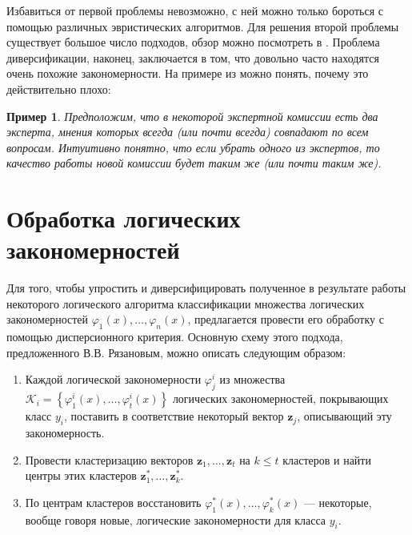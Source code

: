 \documentclass[12pt]{article}
\newtheorem{example}{Пример}
\begin{document}
Избавиться от первой проблемы невозможно, с ней можно только бороться
с помощью различных эвристических алгоритмов. Для решения второй
проблемы существует большое число подходов, обзор можно посмотреть в
\cite{furnkranz97pruning}. Проблема диверсификации, наконец,
заключается в том, что довольно часто находятся очень похожие
закономерности. На примере из \cite{voron10logicalgs} можно понять,
почему это действительно плохо:

\begin{example}
  Предположим, что в некоторой экспертной комиссии есть два эксперта,
  мнения которых всегда (или почти всегда) совпадают по всем
  вопросам. Интуитивно понятно, что если убрать одного из экспертов,
  то качество работы новой комиссии будет таким же (или почти таким
  же).
\end{example}

\section{Обработка логических закономерностей}
\label{sec:processing}


Для того, чтобы упростить и диверсифицировать полученное в результате
работы некоторого логического алгоритма классификации множества
логических закономерностей \(\varphi_1(x), \dots, \varphi_n(x)\),
предлагается провести его обработку с помощью дисперсионного критерия.
Основную схему этого подхода, предложенного В.В. Рязановым, можно
описать следующим образом:

\begin{enumerate}
\item Каждой логической закономерности \(\varphi_j^i\) из множества
  \(
  \mathcal{K}_{i} = \left\{
  \varphi_1^i(x), \dots, \varphi_t^i(x)
  \right\}
  \)
  логических закономерностей, покрывающих класс \(y_i\), поставить в
  соответствие некоторый вектор \(\bm{z}_j\), описывающий эту
  закономерность.
\item Провести кластеризацию векторов \(\bm{z}_1, \dots, \bm{z}_t\) на
  \(k \leq t\) кластеров и найти центры этих кластеров
  \(\bm{z}_1^*, \dots, \bm{z}_k^*\).
\item По центрам кластеров восстановить \(\varphi_1^*(x), \dots,
  \varphi_k^*(x)\) --- некоторые, вообще говоря новые, логические
  закономерности для класса \(y_i\).
\end{enumerate}
\end{document}
